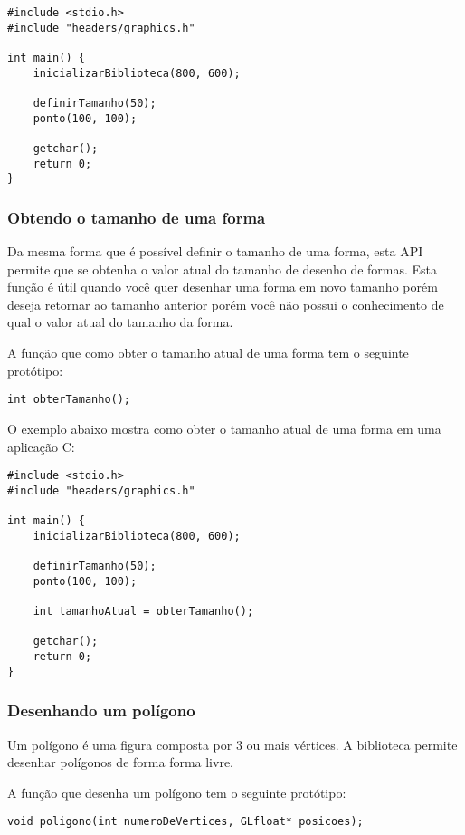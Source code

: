 \documentclass[12pt, %
openright,
oneside, %
a4paper,    %
brazil]{facom-ufu-abntex2}
\begin{document}
\begin{lstlisting}
#include <stdio.h>
#include "headers/graphics.h"

int main() {
    inicializarBiblioteca(800, 600);

    definirTamanho(50);
    ponto(100, 100);

    getchar();
    return 0;
}
\end{lstlisting}

\subsubsection{Obtendo o tamanho de uma forma}
Da mesma forma que é possível definir o tamanho de uma forma, esta API permite que se obtenha o valor atual do tamanho de desenho de formas. Esta função é útil quando você quer desenhar uma forma em novo tamanho porém deseja retornar ao tamanho anterior porém você não possui o conhecimento de qual o valor atual do tamanho da forma.

A função que como obter o tamanho atual de uma forma tem o seguinte protótipo:

\begin{lstlisting}
int obterTamanho();
\end{lstlisting}

O exemplo abaixo mostra como obter o tamanho atual de uma forma em uma aplicação C:

\begin{lstlisting}
#include <stdio.h>
#include "headers/graphics.h"

int main() {
    inicializarBiblioteca(800, 600);

    definirTamanho(50);
    ponto(100, 100);

    int tamanhoAtual = obterTamanho();

    getchar();
    return 0;
}
\end{lstlisting}

\subsubsection{Desenhando um polígono}
Um polígono é uma figura composta por 3 ou mais vértices. A biblioteca permite desenhar polígonos de forma forma livre.

A função que desenha um polígono tem o seguinte protótipo:

\begin{lstlisting}
void poligono(int numeroDeVertices, GLfloat* posicoes);
\end{lstlisting}
\end{document}
